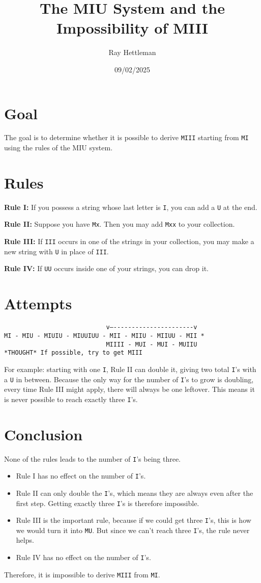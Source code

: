 \documentclass[11pt]{article}
\title{The MIU System and the Impossibility of MIII}
\author{Ray Hettleman}
\date{09/02/2025}
\begin{document}
\maketitle

\section*{Goal}
The goal is to determine whether it is possible to derive \texttt{MIII} starting from \texttt{MI} using the rules of the MIU system.

\section*{Rules}
\textbf{Rule I:} If you possess a string whose last letter is \texttt{I}, you can add a \texttt{U} at the end.  

\textbf{Rule II:} Suppose you have \texttt{Mx}. Then you may add \texttt{Mxx} to your collection.  

\textbf{Rule III:} If \texttt{III} occurs in one of the strings in your collection, you may make a new string with \texttt{U} in place of \texttt{III}.  

\textbf{Rule IV:} If \texttt{UU} occurs inside one of your strings, you can drop it.  

\section*{Attempts}
\noindent
\begin{verbatim}
                            v—----------------------v
MI - MIU - MIUIU - MIUUIUU - MII - MIIU - MIIUU - MII *
                            MIIII - MUI - MUI - MUIIU
*THOUGHT* If possible, try to get MIII
\end{verbatim}

For example: starting with one \texttt{I}, Rule II can double it, giving two total \texttt{I}'s with a \texttt{U} in between. Because the only way for the number of \texttt{I}'s to grow is doubling, every time Rule III might apply, there will always be one leftover. This means it is never possible to reach exactly three \texttt{I}'s.

\section*{Conclusion}
None of the rules leads to the number of \texttt{I}'s being three.  

\begin{itemize}
    \item Rule I has no effect on the number of \texttt{I}'s.  
    \item Rule II can only double the \texttt{I}'s, which means they are always even after the first step. Getting exactly three \texttt{I}'s is therefore impossible.  
    \item Rule III is the important rule, because if we could get three \texttt{I}'s, this is how we would turn it into \texttt{MU}. But since we can’t reach three \texttt{I}'s, the rule never helps.  
    \item Rule IV has no effect on the number of \texttt{I}'s.  
\end{itemize}

Therefore, it is impossible to derive \texttt{MIII} from \texttt{MI}.
\end{document}
